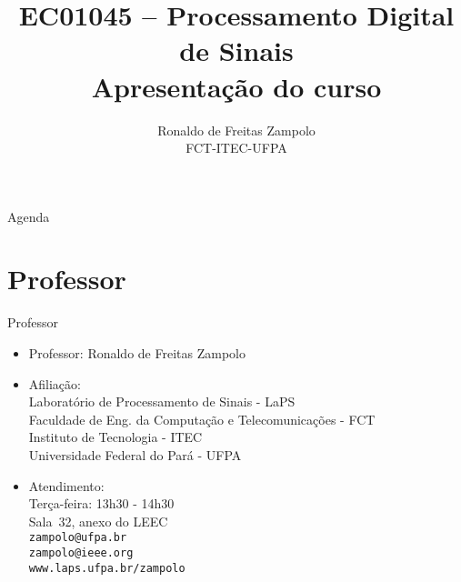 \documentclass[
size=17pt,
paper=smartboard,
mode=present,
display=slidesnotes,
style=sailor,
nopagebreaks,
blackslide,
fleqn]{powerdot}
\title{\Large EC01045 -- Processamento Digital de Sinais\\ \vspace{1cm}Apresentação do curso}
\author{Ronaldo de Freitas Zampolo\\FCT-ITEC-UFPA}
\date{ }
\begin{document}
   \maketitle[randomdots={false}]
   \begin{slide}{Agenda}
      \tableofcontents[content=sections]
   \end{slide}

   \section[ slide = false ]{Professor }
      \begin{slide}[toc=]{Professor}
         \begin{itemize}
            \item Professor: Ronaldo de Freitas Zampolo
            \item Afiliação:\\
                  Laboratório de Processamento de Sinais - LaPS\\
                  Faculdade de Eng. da Computação e Telecomunicações - FCT\\
                  Instituto de Tecnologia - ITEC\\
                  Universidade Federal do Pará - UFPA
            \item Atendimento:\\
                  Terça-feira: 13h30 - 14h30\\
                  Sala~32, anexo do LEEC\\
                  \texttt{zampolo@ufpa.br}\\ 
                  \texttt{zampolo@ieee.org}\\
                  \texttt{www.laps.ufpa.br/zampolo}
         \end{itemize}
      \end{slide}
      
\end{document}

